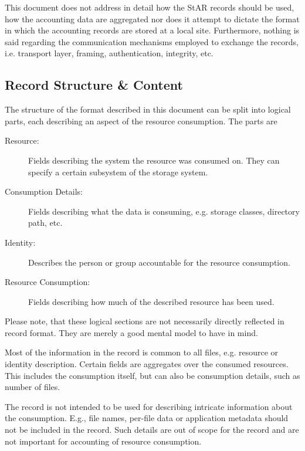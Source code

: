 This document does not address in detail how the StAR records should be used, 
how the accounting data are aggregated 
nor does it attempt to dictate the format in which the accounting records are 
stored at a local site. 
Furthermore, nothing is said regarding the communication mechanisms
employed to exchange the records, i.e. transport layer, framing, 
authentication, integrity, etc.


\subsection{Record Structure \& Content}

The structure of the format described in this document can be split into
logical parts, each describing an aspect of the resource consumption.
The parts are
\begin{description}

\item[Resource:] Fields describing the system the resource was consumed on. They 
can specify a certain subsystem of the storage system.

\item[Consumption Details:] Fields describing what the data is consuming, e.g. 
storage classes, directory path, etc.

\item[Identity:] Describes the person or group accountable for the resource
consumption.

\item[Resource Consumption:] Fields describing how much of the described
resource has been used.

\end{description}

Please note, that these logical sections are not necessarily directly reflected
in record format. They are merely a good mental model to have in mind.

Most of the information in the record is common to all files, e.g. resource or
identity description. Certain fields are aggregates over the consumed
resources. This includes the consumption itself, but can also be consumption
details, such as number of files.

The record is not intended to be used for describing intricate information
about the consumption. E.g., file names, per-file data or application
metadata should not be included in the record. Such details are out of scope
for the record and are not important for accounting of resource consumption.

